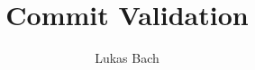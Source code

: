 \documentclass[twoside, english, draft]{sdqseminar}
\author{Lukas Bach}
\title{Commit Validation}
\begin{document}
\setpdf
\maketitle

\begin{abstract}

\end{abstract}




\printbibliography[heading=bibintoc]
\end{document}
